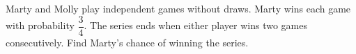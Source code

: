 Marty and Molly play independent games without draws. Marty wins each game with probability $\dfrac{3}{4}$. The series ends when either player wins two games consecutively. Find Marty's chance of winning the series.
